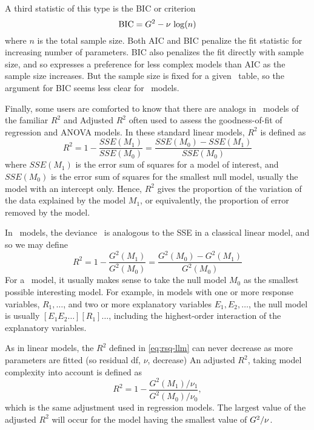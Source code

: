 A third statistic of this type is the BIC or \citet{Schwartz:78} criterion
\begin{equation*}
\mbox{BIC} = G^2 -  \nu \,\log (n)
\end{equation*}
where $n$ is the total sample size.  Both AIC and BIC penalize the fit
statistic for increasing number of parameters.
BIC also penalizes the fit directly with sample size, and so expresses
a preference for less complex models than AIC as the sample size increases.
But the sample size is fixed for a given \mway\ table, so the argument
for BIC seems less clear for \loglin\ models.

Finally, some users are comforted to know that there are analogs 
in \loglin\ models of the
familiar $R^2$ and Adjusted $R^2$ often used to assess the goodness-of-fit
of regression and ANOVA models.
In these standard linear models, $R^2$ is defined as
\begin{equation*}
R^2 = 1 - \frac{SSE (M_1)}{SSE (M_0)} =
  \frac{SSE (M_0) - SSE (M_1)}{SSE (M_0)}
\end{equation*}
where $SSE (M_1)$ is the error sum of squares for a model of interest, and
$SSE (M_0)$ is the error sum of squares for the smallest null model,
usually the model with an intercept only.
Hence, $R^2$ gives the proportion of the variation of the data explained
by the model $M_1$, or equivalently, the proportion of error removed by
the model.

In \loglin\ models, the deviance \GSQ\ is analogous to the SSE in a
classical linear model, and so we may define
\begin{equation}\label{eq:rsq-llm}
R^2 = 1 - \frac{G^2 (M_1)}{G^2 (M_0)} =
  \frac{G^2 (M_0) - G^2 (M_1)}{G^2 (M_0)}
\end{equation}
For a \loglin\ model, it usually makes sense to take the null model $M_0$
as the smallest possible interesting model.
For example, in models with one or more response variables, $R_1 , \dots$,
and two or
more explanatory variables $E_1 , E_2, \dots$,
the null model is usually $[ E_1 E_2 \dots ] [R_1] \dots$,
including the highest-order interaction of the explanatory variables.

As in linear models, the $R^2$ defined in \eqref{eq:rsq-llm} can never
decrease as more parameters are fitted (so residual df, $\nu$, decrease)
An adjusted $R^2$, taking model complexity into account is defined
as
\begin{equation*}
 R^2 = 1 - \frac{G^2 (M_1) / \nu_1 }{G^2 (M_0) / \nu_0}
 \comma
\end{equation*}
which is the same adjustment used in regression models.
The largest value of the adjusted $R^2$ will occur for the model having
the smallest value of $G^2 / \nu$.
